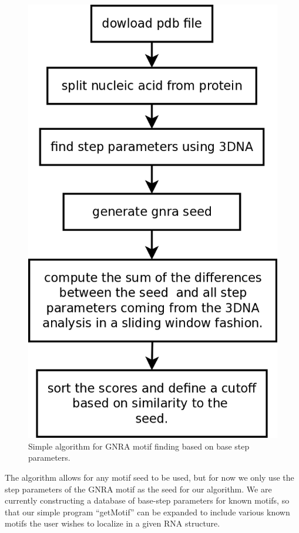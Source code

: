 \begin{figure}
\centering
\includegraphics[angle=0, scale=0.4]{Chapter5/getMotif.png}
\caption{Simple algorithm  for GNRA motif  finding based on  base step
  parameters.}
\label{fig:getMotif}
\end{figure}
  
The algorithm  allows for any  motif seed to  be used, but for  now we
only use the step parameters of the GNRA motif as the seed for our
algorithm.   We are  currently  constructing a  database of  base-step
parameters for  known motifs, so  that our simple  program ``getMotif''
can be expanded  to include various known motifs  the user wishes
to localize in a given RNA structure.

